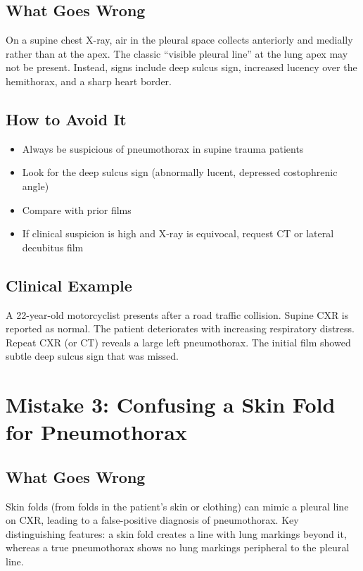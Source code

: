 \subsection{What Goes Wrong}
On a supine chest X-ray, air in the pleural space collects anteriorly and medially rather than at the apex. The classic ``visible pleural line'' at the lung apex may not be present. Instead, signs include deep sulcus sign, increased lucency over the hemithorax, and a sharp heart border.

\subsection{How to Avoid It}
\begin{itemize}
    \item Always be suspicious of pneumothorax in supine trauma patients
    \item Look for the deep sulcus sign (abnormally lucent, depressed costophrenic angle)
    \item Compare with prior films
    \item If clinical suspicion is high and X-ray is equivocal, request CT or lateral decubitus film
\end{itemize}

\subsection{Clinical Example}
A 22-year-old motorcyclist presents after a road traffic collision. Supine CXR is reported as normal. The patient deteriorates with increasing respiratory distress. Repeat CXR (or CT) reveals a large left pneumothorax. The initial film showed subtle deep sulcus sign that was missed.

\clearpage

\section{Mistake 3: Confusing a Skin Fold for Pneumothorax}

\subsection{What Goes Wrong}
Skin folds (from folds in the patient's skin or clothing) can mimic a pleural line on CXR, leading to a false-positive diagnosis of pneumothorax. Key distinguishing features: a skin fold creates a line with lung markings beyond it, whereas a true pneumothorax shows no lung markings peripheral to the pleural line.

